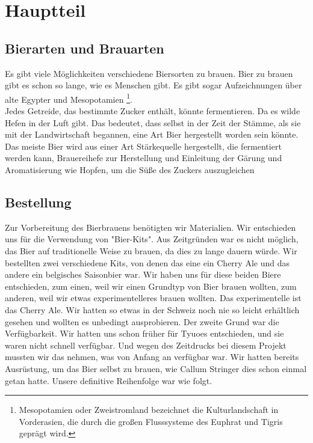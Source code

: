 \newpage
\section{Hauptteil}
\subsection{Bierarten und Brauarten}
Es gibt viele Möglichkeiten verschiedene Biersorten zu brauen.
Bier zu brauen gibt es schon so lange, wie es Menschen gibt. Es gibt sogar Aufzeichnungen über alte Egypter und Mesopotamien \footnote{
	Mesopotamien oder Zweistromland bezeichnet die Kulturlandschaft in Vorderasien, die durch die großen Flusssysteme des Euphrat und Tigris geprägt wird.\cite{wiki.brewing}
}.\\
Jedes Getreide, das bestimmte Zucker enthält, könnte fermentieren. Da es wilde Hefen in der Luft gibt.
Das bedeutet, dass selbst in der Zeit der Stämme, als sie mit der Landwirtschaft begannen, eine Art Bier hergestellt worden sein könnte.\\
Das meiste Bier wird aus einer Art Stärkequelle hergestellt, die fermentiert werden kann, Brauereihefe zur Herstellung und Einleitung der
Gärung und Aromatisierung wie Hopfen, um die Süße des Zuckers auszugleichen

\subsection{Bestellung}
Zur Vorbereitung des Bierbrauens benötigten wir Materialien.
Wir entschieden uns für die Verwendung von "Bier-Kits". Aus Zeitgründen war es nicht möglich,
das Bier auf traditionelle Weise zu brauen, da dies zu lange dauern würde.
Wir bestellten zwei verschiedene Kits, von denen das eine ein Cherry Ale und das andere ein belgisches Saisonbier war.
Wir haben uns für diese beiden Biere entschieden, zum einen, weil wir einen Grundtyp von Bier brauen wollten, zum anderen, weil wir etwas experimentelleres brauen wollten.  Das experimentelle ist das Cherry Ale. Wir hatten so etwas in der Schweiz noch nie so leicht erhältlich gesehen und wollten es unbedingt ausprobieren.
Der zweite Grund war die Verfügbarkeit. Wir hatten uns schon früher für Tyuoes entschieden, und sie waren nicht schnell verfügbar. Und wegen des Zeitdrucks bei diesem Projekt mussten wir das nehmen, was von Anfang an verfügbar war.
\newpage
Wir hatten bereits Ausrüstung, um das Bier selbst zu brauen, wie Callum Stringer dies schon einmal getan hatte.
Unsere definitive Reihenfolge war wie folgt.


